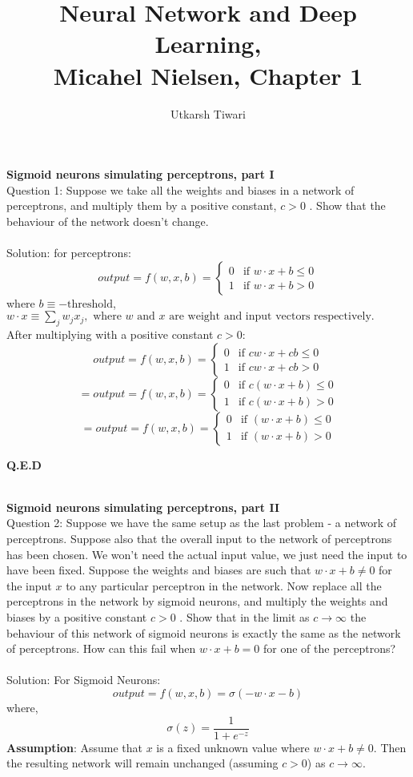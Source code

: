 \documentclass[18pt]{article}
\title{Neural Network and Deep Learning, \\ Micahel Nielsen, Chapter 1}
\author{Utkarsh Tiwari}
\begin{document}
\maketitle

\textbf{Sigmoid neurons simulating perceptrons, part I} \\
Question 1: Suppose we take all the weights and biases in a network of perceptrons, and multiply them by a positive constant, $c>0$
. Show that the behaviour of the network doesn't change. \\ \\
Solution: for perceptrons: $$
output=f(w,x,b)=
\begin{cases}
0 & \text{if } w\cdot x+b \leq 0 \\
1 & \text{if } w\cdot x+b > 0
\end{cases}
$$ 
where $b \equiv -\text{threshold}$,
$w \cdot x \equiv \sum_{j} w_j x_j, \text{ where } w \text{ and } x \text{ are weight and input vectors respectively.}$
\\
After multiplying with a positive constant $c>0$: $$
output=f(w,x,b)=
\begin{cases}
0 & \text{if } cw\cdot x+cb \leq 0 \\
1 & \text{if } cw\cdot x+cb > 0
\end{cases}
$$
$$
=output=f(w,x,b)=
\begin{cases}
0 & \text{if } c(w\cdot x+b) \leq 0 \\
1 & \text{if } c(w\cdot x+b) > 0
\end{cases}
$$
$$
=output=f(w,x,b)=
\begin{cases}
0 & \text{if } (w\cdot x+b) \leq 0 \\
1 & \text{if } (w\cdot x+b) > 0
\end{cases}
$$

\textbf{Q.E.D}

\\
\textbf{Sigmoid neurons simulating perceptrons, part II} \\

Question 2: Suppose we have the same setup as the last problem - a network of perceptrons. Suppose also that the overall input to the network of perceptrons has been chosen. We won't need the actual input value, we just need the input to have been fixed. Suppose the weights and biases are such that $w \cdot x + b \neq 0$
 for the input $x$ to any particular perceptron in the network. Now replace all the perceptrons in the network by sigmoid neurons, and multiply the weights and biases by a positive constant $c>0$
. Show that in the limit as $c \rightarrow \infty$
 the behaviour of this network of sigmoid neurons is exactly the same as the network of perceptrons. How can this fail when $w⋅x+b=0$
 for one of the perceptrons? \\ \\
Solution: For Sigmoid Neurons:
$$
output=f(w,x,b)= \sigma(-w\cdot x-b)
$$ 
where, $$
\sigma(z)=\frac{1}{1 + e^{-z}}
$$
\textbf{Assumption}:
Assume that $x$ is a fixed unknown value where $w \cdot x + b \neq 0$. Then the resulting network will remain unchanged (assuming $c > 0$) as $c \rightarrow \infty$.
\end{document}
